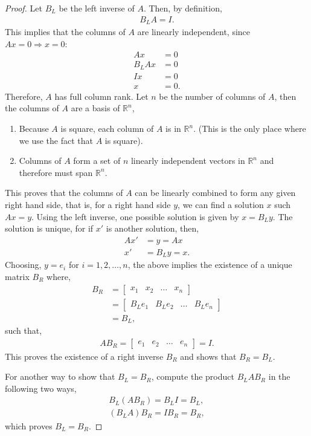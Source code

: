 \documentclass{amsart}
\theoremstyle{plain}
\numberwithin{equation}{section}
\begin{document}
\begin{proof}
Let $B_L$ be the left inverse of $A$. Then, by definition, 
\begin{align*}
B_LA = I.
\end{align*}
This implies that the columns of $A$ are linearly 
independent, since $Ax=0 \Longrightarrow x = 0$:
\begin{align*}
Ax&=0 \\
B_LAx&=0\\ 
Ix &= 0\\
x &= 0.
\end{align*}
Therefore, $A$ has full column rank. Let $n$ be the 
number of columns of $A$, then the columns of 
$A$ are a basis of $\mathbb{R}^{n}$,
\begin{enumerate}
\item Because $A$ is square, each column of $A$ is in $\mathbb{R}^n$. (This is the only place where we use the fact that $A$ is square).
\item Columns of $A$ form a set of $n$ linearly independent vectors in $\mathbb{R}^n$ 
and therefore must span $\mathbb{R}^n$.
\end{enumerate}
This proves that the columns of $A$ can be linearly combined to 
form any given right hand side, that is, for a right hand side $y$, we can find 
a solution $x$ such $Ax=y$. Using the left inverse, one possible solution 
is given by $x = B_Ly$. The solution is unique, for if $x'$ is another solution, then,
\begin{align*}
Ax' &= y = Ax\\
x'&= B_Ly = x.
\end{align*}
Choosing, $y=e_i$ for $ i =1, 2, \ldots, n$, the above implies the existence of a 
unique matrix $B_R$ where, 
\begin{align*}
B_R &= 
\begin{bmatrix}
x_1 & x_2 & \ldots & x_n
\end{bmatrix}\\
&= 
\begin{bmatrix}
B_L e_1 & B_L e_2 & \ldots & B_L e_n
\end{bmatrix}\\
&= B_L,
\end{align*}
such that,
\begin{align*}
AB_R = 
\begin{bmatrix}
e_1 & e_2 & \ldots & e_n
\end{bmatrix}=
I.
\end{align*}
This proves the existence of a right inverse $B_R$ and 
shows that $B_R=B_L$.

For another way to show that $B_L = B_R$, compute the product $B_LAB_R$ in the 
following two ways,
\begin{align*}
B_L (A B_R) = B_L I = B_L,\\
(B_L A) B_R  = I B_R = B_R,
\end{align*}
which proves $B_L = B_R$. 
\end{proof}
\end{document}

